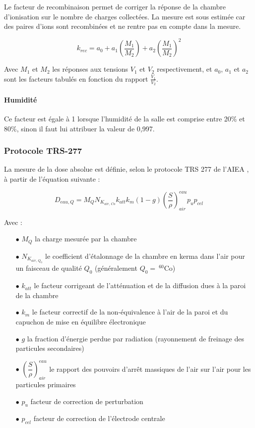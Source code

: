 \documentclass{article}
\begin{document}
Le facteur de recombinaison permet de corriger la réponse de la chambre d'ionisation sur le nombre de charges collectées. La mesure est sous estimée car des paires d'ions sont recombinées et ne rentre pas en compte dans la mesure.

\begin{equation}
  k_{rec} = a_0 + a_1 \left(\dfrac{M_1}{M_2}\right) + a_2 \left(\dfrac{M_1}{M_2}\right) ^2
  \label{eq_rec}
\end{equation}

Avec $M_1$ et $M_2$ les réponses aux tensions $V_1$ et $V_2$ respectivement, et $a_0$, $a_1$ et $a_2$ sont les facteurs tabulés en fonction du rapport $\frac{V_1}{V_2}$.

\paragraph{Humidité}

Ce facteur est égale à 1 lorsque l'humidité de la salle est comprise entre 20\% et 80\%, sinon il faut lui attribuer la valeur de 0,997.

\subsubsection{Protocole TRS-277}

La mesure de la dose absolue est définie, selon le protocole TRS 277 de l'AIEA \cite{internationaliaea}, à partir de l'équation suivante :

\begin{equation}
  D_{eau, Q} = M_Q N_{K_{air, \, Co}} k_{att} k_{m} (1-g) \left(\dfrac{S}{\rho}\right)^{eau}_{air} p_u p_{cel}
  \label{eq_dose_277}
\end{equation}

Avec :

\begin{itemize}
  \item[$\bullet$] $M_Q$ la charge mesurée par la chambre
  \item[$\bullet$] $N_{K_{air, \, Q_0}}$ le coefficient d'étalonnage de la chambre en kerma dans l'air pour un faisceau de qualité $Q_0$ (généralement $Q_0  =\: ^{60}$Co)
  \item[$\bullet$] $k_{att}$ le facteur corrigeant de l'atténuation et de la diffusion dues à la paroi de la chambre
  \item[$\bullet$] $k_m$ le facteur correctif de la non-équivalence à l'air de la paroi et du capuchon de mise en équilibre électronique
  \item[$\bullet$] $g$ la fraction d'énergie perdue par radiation (rayonnement de freinage des particules secondaires)
  \item[$\bullet$] $\left(\dfrac{S}{\rho}\right) ^{eau}_{air}$ le rapport des pouvoirs d'arrêt massiques de l'air sur l'air pour les particules primaires
  \item[$\bullet$] $p_u$ facteur de correction de perturbation
  \item[$\bullet$] $p_{cel}$ facteur de correction de l'électrode centrale
\end{itemize}
\end{document}
